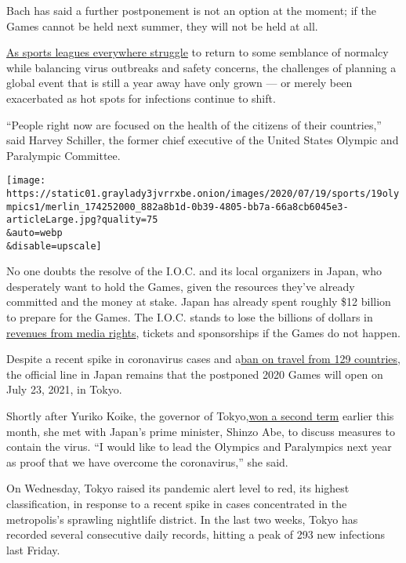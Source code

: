 Bach has said a further postponement is not an option at the moment; if
the Games cannot be held next summer, they will not be held at all.

\href{https://okcthunderwire.usatoday.com/2020/07/14/nba-players-in-orlando-bubble-positive-coronavirus-tests/}{As
sports leagues everywhere struggle} to return to some semblance of
normalcy while balancing virus outbreaks and safety concerns, the
challenges of planning a global event that is still a year away have
only grown --- or merely been exacerbated as hot spots for infections
continue to shift.

``People right now are focused on the health of the citizens of their
countries,'' said Harvey Schiller, the former chief executive of the
United States Olympic and Paralympic Committee.

\texttt{[image: https://static01.graylady3jvrrxbe.onion/images/2020/07/19/sports/19olympics1/merlin\_174252000\_882a8b1d-0b39-4805-bb7a-66a8cb6045e3-articleLarge.jpg?quality=75\\\&auto=webp\\\&disable=upscale]}

No one doubts the resolve of the I.O.C. and its local organizers in
Japan, who desperately want to hold the Games, given the resources
they've already committed and the money at stake. Japan has already
spent roughly \$12 billion to prepare for the Games. The I.O.C. stands
to lose the billions of dollars in
\href{https://www.nytimes3xbfgragh.onion/2014/05/08/sports/olympics/nbc-extends-olympic-tv-deal-through-2032.html}{revenues
from media rights}, tickets and sponsorships if the Games do not happen.

Despite a recent spike in coronavirus cases and
a\href{https://www.mofa.go.jp/ca/fna/page4e_001053.html}{ban on travel
from 129 countries}, the official line in Japan remains that the
postponed 2020 Games will open on July 23, 2021, in Tokyo.

Shortly after Yuriko Koike, the governor of
Tokyo,\href{https://www.nytimes3xbfgragh.onion/2020/07/05/world/asia/tokyo-governor-election.html?searchResultPosition=2}{won
a second term} earlier this month, she met with Japan's prime minister,
Shinzo Abe, to discuss measures to contain the virus. ``I would like to
lead the Olympics and Paralympics next year as proof that we have
overcome the coronavirus,'' she said.

On Wednesday, Tokyo raised its pandemic alert level to red, its highest
classification, in response to a recent spike in cases concentrated in
the metropolis's sprawling nightlife district. In the last two weeks,
Tokyo has recorded several consecutive daily records, hitting a peak of
293 new infections last Friday.

